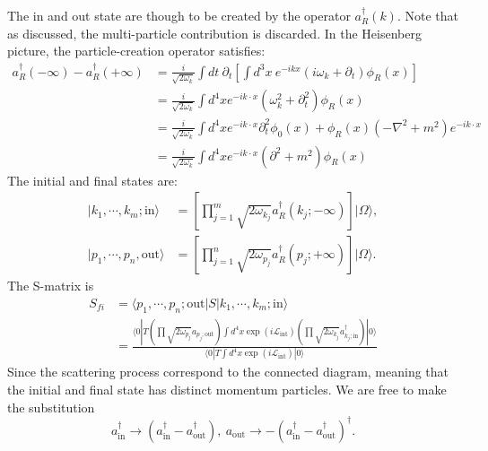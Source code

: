 \documentclass[aps,prb,superscriptaddress,nofootinbib]{revtex4}
\begin{document}
The in and out state are though to be created by the operator $a_R^\dagger(k)$.
Note that as discussed, the multi-particle contribution is discarded.
In the Heisenberg picture, the particle-creation operator satisfies:
\begin{equation}
\begin{aligned}
	a_{R}^\dagger(-\infty) - a_{R}^\dagger(+\infty)
	&= \frac{i}{\sqrt{2\omega_k}} \int dt\ \partial_t \left[\int d^{3}x\ e^{-ikx}(i\omega_k+\partial_t)\phi_R(x)\right] \\
	&= \frac{i}{\sqrt{2\omega_k}} \int d^4 x e^{-ik\cdot x}(\omega_k^2+\partial_t^2)\phi_R(x) \\
	&= \frac{i}{\sqrt{2\omega_k}} \int d^4 x e^{-ik\cdot x}\partial_t^2\phi_0(x) + \phi_R(x)(-\nabla^2+m^2)e^{-i k\cdot x} \\
	&= \frac{i}{\sqrt{2\omega_k}} \int d^4 x e^{-ik\cdot x}(\partial^2+m^2)\phi_R(x)
\end{aligned}
\end{equation}
The initial and final states are:
\begin{equation}
\begin{aligned}
	|k_1, \cdots, k_m; \mathrm{in}\rangle &= \left[\prod_{j=1}^m \sqrt{2\omega_{k_j}} a^\dagger_{R}(k_j;-\infty)\right] |\Omega\rangle, \\
	|p_1, \cdots, p_n, \mathrm{out}\rangle &= \left[\prod_{j=1}^n \sqrt{2\omega_{p_j}}a^\dagger_{R}(p_j;+\infty)\right] |\Omega\rangle.
\end{aligned}
\end{equation}
The S-matrix is
\begin{equation*}
\begin{aligned}
	S_{fi} &= \langle p_1, \cdots, p_n;\mathrm{out}| S |k_1, \cdots, k_m; \mathrm{in}\rangle \\
	&= \frac{\langle 0|T 
		\left(\prod \sqrt{2\omega_{p_j}} a_{p_j;\mathrm{out}} \right)
		\int d^4 x \exp(i\mathcal{L}_{\mathrm{int}})
		\left(\prod \sqrt{2\omega_{k_j}} a^\dagger_{k_j;\mathrm{in}} \right)|0\rangle}
		{\langle 0|T\int d^4 x \exp(i\mathcal{L}_{\mathrm{int}})|0\rangle}
\end{aligned}
\end{equation*}
Since the scattering process correspond to the connected diagram, meaning that the initial and final state has distinct momentum particles.
We are free to make the substitution
\begin{equation*}
	a^\dagger_{\mathrm{in}} \rightarrow (a_{\mathrm{in}}^\dagger - a_{\mathrm{out}}^\dagger),\ 
	a_{\mathrm{out}} \rightarrow -(a_{\mathrm{in}}^\dagger - a_{\mathrm{out}}^\dagger)^\dagger.
\end{equation*}
\end{document}

